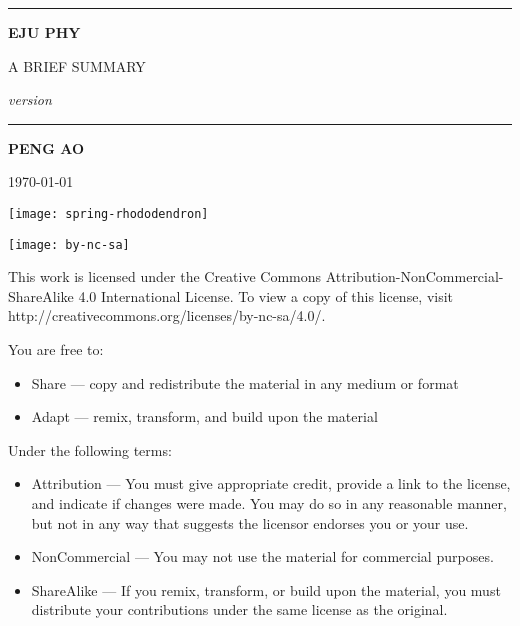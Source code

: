 
\begin{titlepage}
    \begin{center}
        \vspace{4cm}
        
        \rule{\textwidth}{1.2pt}
        
        \vspace{0.3cm}

        {\Huge \textbf{EJU PHY}}

        \vspace{0.3cm}

        {\LARGE A BRIEF SUMMARY}

        \vspace{0.3cm}

        {\Large \textit{version \version}}

        \rule{\textwidth}{1.2pt}

        \vspace{2cm}

        {\LARGE \textbf{PENG AO}}

        \vspace{0.5cm}
        {\Large \today}

        \vfill

        \texttt{[image: spring-rhododendron]}
    \end{center}
\end{titlepage}


\clearpage
\begin{flushleft}
    \null

    \vfill
    \texttt{[image: by-nc-sa]}

    This work is licensed under the Creative Commons Attribution-NonCommercial-ShareAlike 4.0 International License. To view a copy of this license, visit http://creativecommons.org/licenses/by-nc-sa/4.0/.

    \vspace{1em}
    You are free to:
    \begin{itemize}
        \item Share — copy and redistribute the material in any medium or format
        \item Adapt — remix, transform, and build upon the material
    \end{itemize}

    Under the following terms:
    \begin{itemize}
        \item Attribution — You must give appropriate credit, provide a link to the license, and indicate if changes were made. You may do so in any reasonable manner, but not in any way that suggests the licensor endorses you or your use.
        \item NonCommercial — You may not use the material for commercial purposes.
        \item ShareAlike — If you remix, transform, or build upon the material, you must distribute your contributions under the same license as the original.
    \end{itemize}
\end{flushleft}

